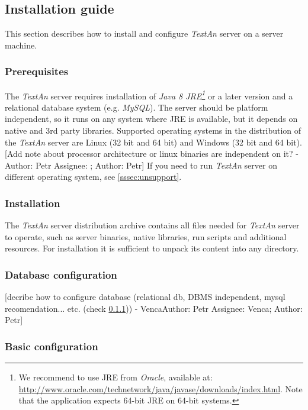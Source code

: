 \documentclass[12pt,a4paper]{report}
\makeatletter
\newcommand{\comment}[3][\@empty]{
  {\color{magenta}[#3 - }
  {\color{green}\ifx\@empty#1\relax Author: #2 \else Assignee: #1; Author: #2\fi}{\color{magenta}]}
}
\newcommand{\textan}{\emph{TextAn}}
\makeatother
\begin{document}
\subsection{Installation guide}

This section describes how to install and configure \textan{} server on a server
machine.

\subsubsection{Prerequisites}
\label{sssec:SerInstPre}

The \textan{} server requires installation of \emph{Java 8 JRE\footnote{We
recommend to use JRE from \emph{Oracle}, available at:
\url{http://www.oracle.com/technetwork/java/javase/downloads/index.html}.
Note that the application expects 64-bit JRE on 64-bit systems.}}
or a later version and a relational database system (e.g. \emph{MySQL}).
The server should be platform independent, so it runs on any system where JRE
is available, but it depends on native and 3rd party libraries. Supported operating
systems in the distribution of the \textan{} server are Linux (32 bit and 64 bit)
and Windows (32 bit and 64 bit). \comment{Petr}{Add note about processor architecture
or linux binaries are independent on it?} If you need to run \textan{} server on
different operating system, see \ref{sssec:unsupport}.

\subsubsection{Installation}

The \textan{} server distribution archive contains all files needed for \textan{} server to operate,
such as server binaries, native libraries, run scripts and additional resources.
For installation it is sufficient to unpack its content into any directory.

\subsubsection{Database configuration}
\comment[Venca]{Petr}{decribe how to configure database (relational db, DBMS
independent, mysql recomendation... etc. (check \ref{sssec:SerInstPre}))}

\subsubsection{Basic configuration}
\end{document}
